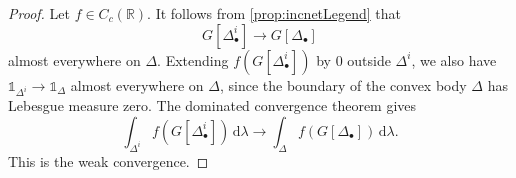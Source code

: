 \begin{proof}
    Let $f\in C_c(\mathbb{R})$. It follows from \cref{prop:incnetLegend} that
    \[
    G[\Delta_{\bullet}^i]\to G[\Delta_{\bullet}]
    \]
    almost everywhere on $\Delta$.
    Extending $f(G[\Delta_{\bullet}^i])$ by $0$ outside $\Delta^i$, we also have $\mathds{1}_{\Delta^i}\to \mathds{1}_{\Delta}$ almost everywhere on $\Delta$, since the boundary of the convex body $\Delta$ has Lebesgue measure zero. The dominated convergence theorem gives
    \[
        \int_{\Delta^i} f(G[\Delta_{\bullet}^i])\,\mathrm{d}\lambda\to \int_{\Delta} f(G[\Delta_{\bullet}])\,\mathrm{d}\lambda.
    \]
    This is the weak convergence.
\end{proof}









